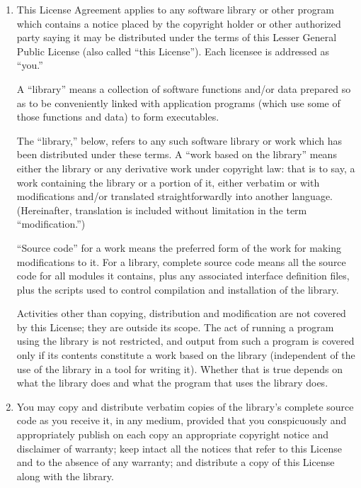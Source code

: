 \documentclass[11pt, letterpaper]{book}
\begin{document}
\begin{enumerate}

\addtocounter{enumi}{-1}

\item

This License Agreement applies to any software library or other program
which contains a notice placed by the copyright holder or other authorized
party saying it may be distributed under the terms of this Lesser General
Public License (also called ``this License''). Each licensee is addressed
as ``you.''

A ``library'' means a collection of software functions and/or data
prepared so as to be conveniently linked with application programs (which
use some of those functions and data) to form executables.

The ``library,'' below, refers to any such software library or work which
has been distributed under these terms. A ``work based on the library''
means either the library or any derivative work under copyright law: that
is to say, a work containing the library or a portion of it, either
verbatim or with modifications and/or translated straightforwardly into
another language. (Hereinafter, translation is included without
limitation in the term ``modification.'')

``Source code'' for a work means the preferred form of the work for making
modifications to it. For a library, complete source code means all the
source code for all modules it contains, plus any associated interface
definition files, plus the scripts used to control compilation and
installation of the library.

Activities other than copying, distribution and modification are not
covered by this License; they are outside its scope. The act of running a
program using the library is not restricted, and output from such a
program is covered only if its contents constitute a work based on the
library (independent of the use of the library in a tool for writing it).
Whether that is true depends on what the library does and what the program
that uses the library does.
  
\item 

You may copy and distribute verbatim copies of the library's complete
source code as you receive it, in any medium, provided that you
conspicuously and appropriately publish on each copy an appropriate
copyright notice and disclaimer of warranty; keep intact all the notices
that refer to this License and to the absence of any warranty; and
distribute a copy of this License along with the library.


\end{enumerate}
\end{document}
